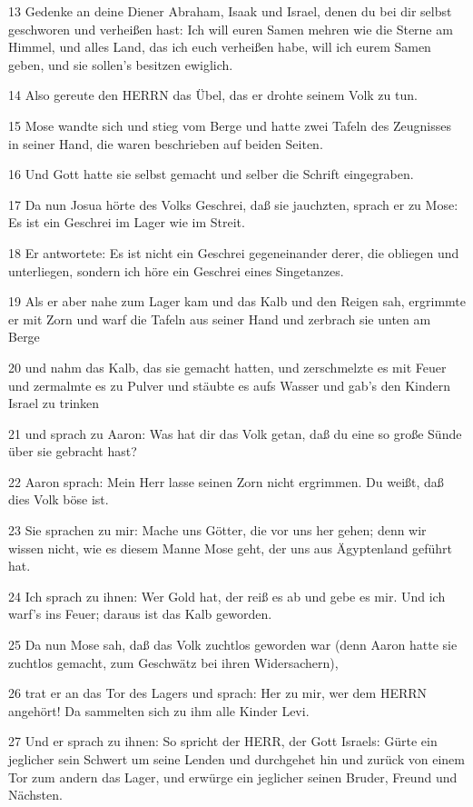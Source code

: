 \par 13 Gedenke an deine Diener Abraham, Isaak und Israel, denen du bei dir selbst geschworen und verheißen hast: Ich will euren Samen mehren wie die Sterne am Himmel, und alles Land, das ich euch verheißen habe, will ich eurem Samen geben, und sie sollen's besitzen ewiglich.
\par 14 Also gereute den HERRN das Übel, das er drohte seinem Volk zu tun.
\par 15 Mose wandte sich und stieg vom Berge und hatte zwei Tafeln des Zeugnisses in seiner Hand, die waren beschrieben auf beiden Seiten.
\par 16 Und Gott hatte sie selbst gemacht und selber die Schrift eingegraben.
\par 17 Da nun Josua hörte des Volks Geschrei, daß sie jauchzten, sprach er zu Mose: Es ist ein Geschrei im Lager wie im Streit.
\par 18 Er antwortete: Es ist nicht ein Geschrei gegeneinander derer, die obliegen und unterliegen, sondern ich höre ein Geschrei eines Singetanzes.
\par 19 Als er aber nahe zum Lager kam und das Kalb und den Reigen sah, ergrimmte er mit Zorn und warf die Tafeln aus seiner Hand und zerbrach sie unten am Berge
\par 20 und nahm das Kalb, das sie gemacht hatten, und zerschmelzte es mit Feuer und zermalmte es zu Pulver und stäubte es aufs Wasser und gab's den Kindern Israel zu trinken
\par 21 und sprach zu Aaron: Was hat dir das Volk getan, daß du eine so große Sünde über sie gebracht hast?
\par 22 Aaron sprach: Mein Herr lasse seinen Zorn nicht ergrimmen. Du weißt, daß dies Volk böse ist.
\par 23 Sie sprachen zu mir: Mache uns Götter, die vor uns her gehen; denn wir wissen nicht, wie es diesem Manne Mose geht, der uns aus Ägyptenland geführt hat.
\par 24 Ich sprach zu ihnen: Wer Gold hat, der reiß es ab und gebe es mir. Und ich warf's ins Feuer; daraus ist das Kalb geworden.
\par 25 Da nun Mose sah, daß das Volk zuchtlos geworden war (denn Aaron hatte sie zuchtlos gemacht, zum Geschwätz bei ihren Widersachern),
\par 26 trat er an das Tor des Lagers und sprach: Her zu mir, wer dem HERRN angehört! Da sammelten sich zu ihm alle Kinder Levi.
\par 27 Und er sprach zu ihnen: So spricht der HERR, der Gott Israels: Gürte ein jeglicher sein Schwert um seine Lenden und durchgehet hin und zurück von einem Tor zum andern das Lager, und erwürge ein jeglicher seinen Bruder, Freund und Nächsten.

